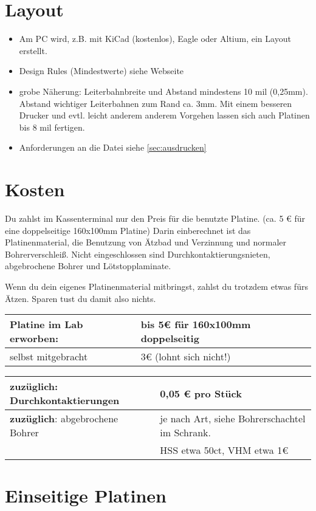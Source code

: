 \documentclass{\basedir/fablab-document}
\begin{document}
\section{Layout}
\begin{itemize}
\item Am PC wird, z.B. mit KiCad (kostenlos), Eagle oder Altium, ein Layout erstellt.
\item Design Rules (Mindestwerte) siehe Webseite
\item grobe Näherung: Leiterbahnbreite und Abstand mindestens 10 mil (0,25mm). Abstand wichtiger Leiterbahnen zum Rand ca. 3mm. Mit einem besseren Drucker und evtl. leicht anderem anderem Vorgehen lassen sich auch Platinen bis 8 mil fertigen.
\item Anforderungen an die Datei siehe \ref{sec:ausdrucken}
\end{itemize}
\section{Kosten}
Du zahlst im Kassenterminal nur den Preis für die benutzte Platine. (ca. 5 € für eine doppelseitige 160x100mm Platine)
Darin einberechnet ist das Platinenmaterial, die Benutzung von Ätzbad und Verzinnung und normaler Bohrerverschleiß.
Nicht eingeschlossen sind Durchkontaktierungsnieten, abgebrochene Bohrer und Lötstopplaminate.

Wenn du dein eigenes Platinenmaterial mitbringst, zahlst du trotzdem etwas fürs Ätzen. Sparen tust du damit also nichts.

\begin{tabularx}{36em}{l|X}
Platine im Lab erworben: & bis 5€ für 160x100mm doppelseitig \\ \hline
selbst mitgebracht& 3€ (lohnt sich nicht!)
\end{tabularx}

\vspace{1.5em}

\begin{tabularx}{36em}{l|X}
\textbf{zuzüglich}: Durchkontaktierungen & 0,05 € pro Stück \\ \hline
\textbf{zuzüglich}: abgebrochene Bohrer & je nach Art, siehe Bohrerschachtel im Schrank. \\
 & HSS etwa 50ct, VHM etwa 1€ \\
\end{tabularx}


\section{Einseitige Platinen}
\secttoc
\end{document}
